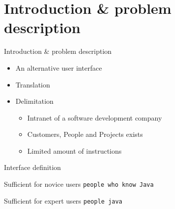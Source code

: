 \section{Introduction \& problem description}
\begin{frame}{Introduction \& problem description} 
    \begin{itemize}
    \item An alternative user interface \pause
    \item Translation \pause %
    \item Delimitation 
      \begin{itemize}
        \item Intranet of a software development company \pause
        \item Customers, People and Projects exists \pause
	    \item Limited amount of instructions
      \end{itemize}
  \end{itemize} 
\end{frame}

\begin{frame}{Interface definition} 
\begin{block}{Sufficient for novice users}
      \texttt{people who know Java}
\end{block}
\pause
\begin{block}{Sufficient for expert users}
      \texttt{people java}
\end{block}
\end{frame}